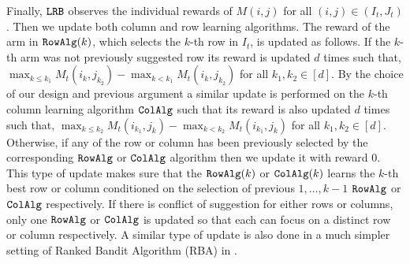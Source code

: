

Finally, ${\tt LRB}$ observes the individual rewards of $M(i,j)$ for all $(i,j)\in (I_t, J_t)$. Then we update both column and row learning algorithms. The reward of the arm in ${\tt RowAlg}(k)$, which selects the $k$-th row in $I_t$, is updated as follows. If the $k$-th arm was not previously suggested row its reward is updated $d$ times such that, $\max_{k \leq k_1} M_t(i_k, j_{k_2}) - \max_{k < k_1} M_t(i_k, j_{k_2})$ for all $k_1,k_2 \in [d]$. By the choice of our design and previous argument a similar update is performed on the $k$-th column learning algorithm ${\tt ColAlg}$ such that its reward is also updated $d$ times such that, $\max_{k \leq k_2} M_t(i_{k_1}, j_k)  - \max_{k < k_2} M_t(i_{k_1}, j_k)$ for all $k_1,k_2 \in [d]$. Otherwise, if any of the row or column has been previously selected by the corresponding ${\tt RowAlg}$ or ${\tt ColAlg}$ algorithm then we update it with reward $0$. This type of update makes sure that the ${\tt RowAlg}(k)$ or ${\tt ColAlg}(k)$ learns the $k$-th best row or column conditioned on the selection of previous $1,\ldots, k-1$ ${\tt RowAlg}$ or ${\tt ColAlg}$ respectively. If there is conflict of suggestion for either rows or columns, only one ${\tt RowAlg}$ or ${\tt ColAlg}$ is updated so that each can focus on a distinct row or column respectively. A similar type of update is also done in a much simpler setting of Ranked Bandit Algorithm (RBA) in \citet{radlinski2008learning}.





